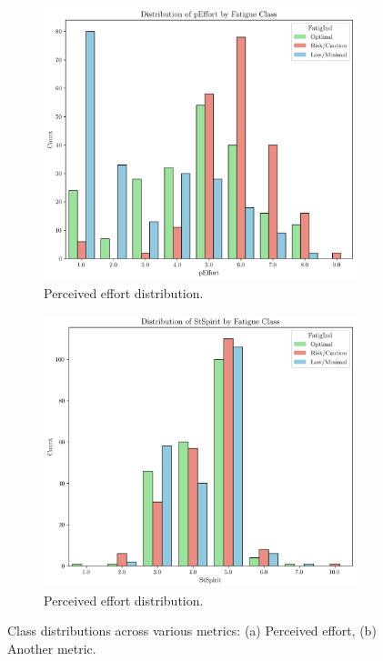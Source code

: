\documentclass[conference]{IEEEtran}
\begin{document}
\begin{figure}
    \centering
    \begin{subfigure}[1]{\linewidth}
        \centering
        \includegraphics[width=\linewidth]{assets/distribution_pEffort.png}
        \caption{Perceived effort distribution.}
        \label{fig:subfig-a}
    \end{subfigure}
    
    \vspace{0.5cm}

    \begin{subfigure}[2]{\linewidth}
        \centering
        \includegraphics[width=\linewidth]{assets/distribution_StSpirit.png}
        \caption{Perceived effort distribution.}
        \label{fig:subfig-b}
    \end{subfigure}
    
    \caption{Class distributions across various metrics: (a) Perceived effort, (b) Another metric.}
    \label{fig:main-figure}
\end{figure}
\end{document}
